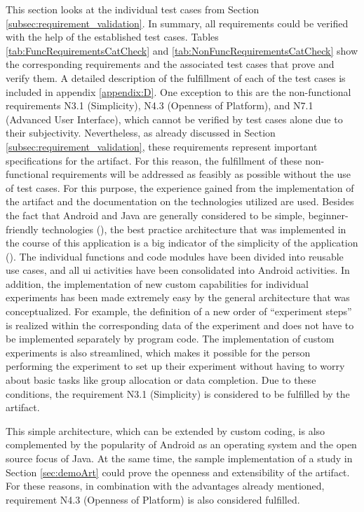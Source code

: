 This section looks at the individual test cases from Section \ref{subsec:requirement_validation}. In summary, all requirements could be verified with the help of the established test cases. Tables \ref{tab:FuncRequirementsCatCheck} and \ref{tab:NonFuncRequirementsCatCheck} show the corresponding requirements and the associated test cases that prove and verify them. A detailed description of the fulfillment of each of the test cases is included in appendix \ref{appendix:D}. One exception to this are the non-functional requirements N3.1 (Simplicity), N4.3 (Openness of Platform), and N7.1 (Advanced User Interface), which cannot be verified by test cases alone due to their subjectivity. Nevertheless, as already discussed in Section \ref{subsec:requirement_validation}, these requirements represent important specifications for the artifact. For this reason, the fulfillment of these non-functional requirements will be addressed as feasibly as possible without the use of test cases. For this purpose, the experience gained from the implementation of the artifact and the documentation on the technologies utilized are used. Besides the fact that Android and Java are generally considered to be simple, beginner-friendly technologies (\cite{Ullenboom.2017}), the best practice architecture that was implemented in the course of this application is a big indicator of the simplicity of the application (\cite{Google.2023}). The individual functions and code modules have been divided into reusable use cases, and all \ac{ui} activities have been consolidated into Android activities. In addition, the implementation of new custom capabilities for individual experiments has been made extremely easy by the general architecture that was conceptualized. For example, the definition of a new order of \enquote{experiment steps} is realized within the corresponding data of the experiment and does not have to be implemented separately by program code. The implementation of custom experiments is also streamlined, which makes it possible for the person performing the experiment to set up their experiment without having to worry about basic tasks like group allocation or data completion. Due to these conditions, the requirement N3.1 (Simplicity) is considered to be fulfilled by the artifact.

This simple architecture, which can be extended by custom coding, is also complemented by the popularity of Android as an operating system and the open source focus of Java. At the same time, the sample implementation of a study in Section \ref{sec:demoArt} could prove the openness and extensibility of the artifact. For these reasons, in combination with the advantages already mentioned, requirement N4.3 (Openness of Platform) is also considered fulfilled. 

